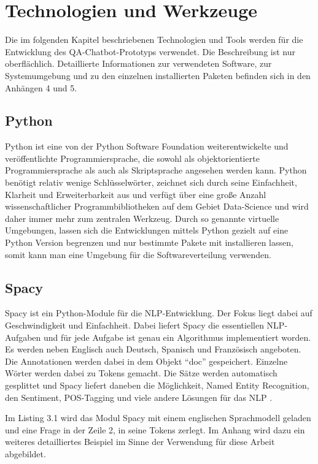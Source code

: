 \documentclass[
        ngerman,
        paper=a4,
        numbers=noendperiod,
]{scrreprt}
\begin{document}
\chapter{Technologien und Werkzeuge}
Die im folgenden Kapitel beschriebenen Technologien und Tools werden für die Entwicklung des QA-Chatbot-Prototyps verwendet. Die Beschreibung ist nur oberflächlich. Detaillierte Informationen zur verwendeten Software, zur Systemumgebung und zu den einzelnen installierten Paketen befinden sich in den Anhängen 4 und 5. %
\section{Python}
Python ist eine von der Python Software Foundation weiterentwickelte und veröffentlichte Programmiersprache, die sowohl als objektorientierte Programmiersprache als auch als Skriptsprache angesehen werden kann. Python benötigt relativ wenige Schlüsselwörter, zeichnet sich durch seine Einfachheit, Klarheit und Erweiterbarkeit aus und verfügt über eine große Anzahl wissenschaftlicher Programmbibliotheken auf dem Gebiet Data-Science und wird daher immer mehr zum zentralen Werkzeug. 
Durch so genannte virtuelle Umgebungen, lassen sich die Entwicklungen mittels Python gezielt auf eine Python Version begrenzen und nur bestimmte Pakete mit installieren lassen, somit kann man eine Umgebung für die Softwareverteilung verwenden. \citep[S. 2]{GrotzGrundkurs0.1.2d}
\section{Spacy}
Spacy ist ein Python-Module für die NLP-Entwicklung. Der Fokus liegt dabei auf Geschwindigkeit und Einfachheit. Dabei liefert Spacy die essentiellen NLP-Aufgaben und für jede Aufgabe ist genau ein Algorithmus implementiert worden. Es werden neben Englisch auch Deutsch, Spanisch und Französisch angeboten. Die Annotationen werden dabei in dem Objekt \enquote{doc} gespeichert. Einzelne Wörter werden dabei zu Tokens gemacht. Die Sätze werden automatisch gesplittet und Spacy liefert daneben die Möglichkeit, Named Entity Recognition, den Sentiment, POS-Tagging und viele andere Lösungen für das NLP \citep{SpaCyDocumentation}.

Im Listing 3.1 wird das Modul Spacy mit einem englischen Sprachmodell geladen und eine Frage in der Zeile 2, in seine Tokens zerlegt. Im Anhang wird dazu ein weiteres detailliertes Beispiel im Sinne der Verwendung für diese Arbeit abgebildet.
\end{document}

